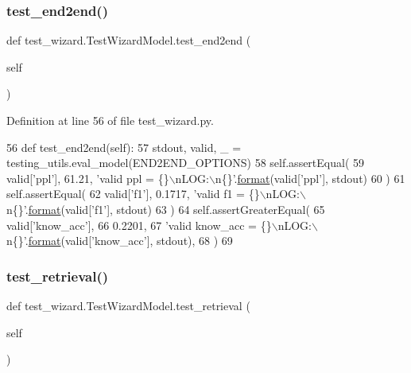 \subsubsection{\texorpdfstring{test\+\_\+end2end()}{test\_end2end()}}
{\footnotesize\ttfamily def test\+\_\+wizard.\+Test\+Wizard\+Model.\+test\+\_\+end2end (\begin{DoxyParamCaption}\item[{}]{self }\end{DoxyParamCaption})}



Definition at line 56 of file test\+\_\+wizard.\+py.


\begin{DoxyCode}
56     \textcolor{keyword}{def }test\_end2end(self):
57         stdout, valid, \_ = testing\_utils.eval\_model(END2END\_OPTIONS)
58         self.assertEqual(
59             valid[\textcolor{stringliteral}{'ppl'}], 61.21, \textcolor{stringliteral}{'valid ppl = \{\}\(\backslash\)nLOG:\(\backslash\)n\{\}'}.\hyperlink{namespaceparlai_1_1chat__service_1_1services_1_1messenger_1_1shared__utils_a32e2e2022b824fbaf80c747160b52a76}{format}(valid[\textcolor{stringliteral}{'ppl'}], stdout)
60         )
61         self.assertEqual(
62             valid[\textcolor{stringliteral}{'f1'}], 0.1717, \textcolor{stringliteral}{'valid f1 = \{\}\(\backslash\)nLOG:\(\backslash\)n\{\}'}.\hyperlink{namespaceparlai_1_1chat__service_1_1services_1_1messenger_1_1shared__utils_a32e2e2022b824fbaf80c747160b52a76}{format}(valid[\textcolor{stringliteral}{'f1'}], stdout)
63         )
64         self.assertGreaterEqual(
65             valid[\textcolor{stringliteral}{'know\_acc'}],
66             0.2201,
67             \textcolor{stringliteral}{'valid know\_acc = \{\}\(\backslash\)nLOG:\(\backslash\)n\{\}'}.\hyperlink{namespaceparlai_1_1chat__service_1_1services_1_1messenger_1_1shared__utils_a32e2e2022b824fbaf80c747160b52a76}{format}(valid[\textcolor{stringliteral}{'know\_acc'}], stdout),
68         )
69 
\end{DoxyCode}
\mbox{\label{classtest__wizard_1_1TestWizardModel_a31b902bf6fff3ccfc8fe52228c2fc20f}} 
\subsubsection{\texorpdfstring{test\+\_\+retrieval()}{test\_retrieval()}}
{\footnotesize\ttfamily def test\+\_\+wizard.\+Test\+Wizard\+Model.\+test\+\_\+retrieval (\begin{DoxyParamCaption}\item[{}]{self }\end{DoxyParamCaption})}



